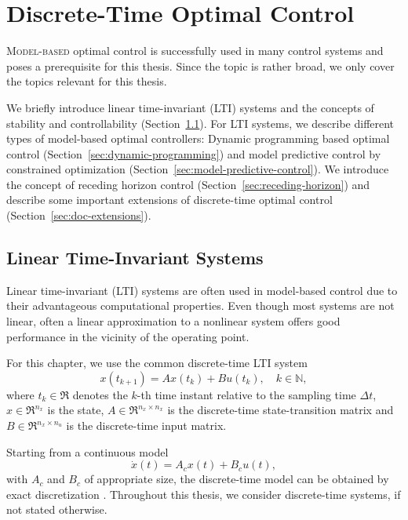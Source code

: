 \renewcommand{\u}{\mathbf{u}}

\chapter{Discrete-Time Optimal Control}
\label{ch:discrete-time-optimal-control}

\lettrine{M}{odel-based} optimal control is successfully used in many
control systems and poses a prerequisite for this thesis. Since the topic is
rather broad, we only cover the topics relevant for this thesis.

We briefly introduce linear time-invariant (LTI) systems and the concepts of
stability and controllability (Section~\ref{sec:lti-systems}). For LTI systems,
we describe different types of model-based optimal controllers: Dynamic
programming based optimal control (Section~\ref{sec:dynamic-programming}) and
model predictive control by constrained optimization
(Section~\ref{sec:model-predictive-control}). We introduce the concept of
receding horizon control (Section~\ref{sec:receding-horizon}) and describe some
important extensions of discrete-time optimal control
(Section~\ref{sec:doc-extensions}).

\section{Linear Time-Invariant Systems}
\label{sec:lti-systems}

Linear time-invariant (LTI) systems are often used in model-based control due
to their advantageous computational properties. Even though most systems
are not linear, often a linear approximation to a nonlinear system offers good
performance in the vicinity of the operating point.
\cite[]{Ogata:2010:Modern}

For this chapter, we use the common discrete-time LTI system
\begin{equation}
  \label{eq:lti-system}
  x(t_{k+1}) = A x(t_k) + B u(t_k),\quad k\in\mathbb{N},
\end{equation}
where $t_k\in\Re$ denotes the $k$-th time instant relative to the
sampling time $\Delta t$, $x\in\Re^{n_x}$ is the state, $A\in\Re^{n_x\times
n_x}$ is the discrete-time state-transition matrix and $B\in\Re^{n_x\times n_u}$
is the discrete-time input matrix.

Starting from a continuous model
\begin{equation}
  \dot x(t) = A_c x(t) + B_c u(t),
\end{equation}
with $A_c$ and $B_c$ of appropriate size,
the discrete-time model can be obtained by exact discretization
.
Throughout this thesis, we consider discrete-time systems, if not stated
otherwise.


